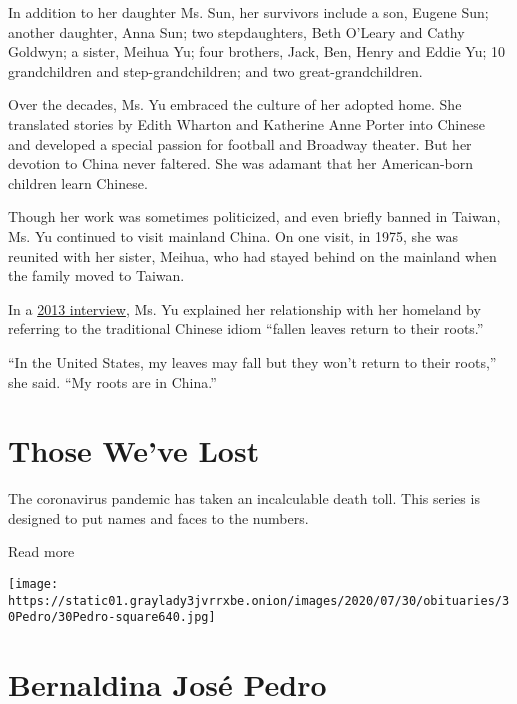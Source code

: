 In addition to her daughter Ms. Sun, her survivors include a son, Eugene
Sun; another daughter, Anna Sun; two stepdaughters, Beth O'Leary and
Cathy Goldwyn; a sister, Meihua Yu; four brothers, Jack, Ben, Henry and
Eddie Yu; 10 grandchildren and step-grandchildren; and two
great-grandchildren.

Over the decades, Ms. Yu embraced the culture of her adopted home. She
translated stories by Edith Wharton and Katherine Anne Porter into
Chinese and developed a special passion for football and Broadway
theater. But her devotion to China never faltered. She was adamant that
her American-born children learn Chinese.

Though her work was sometimes politicized, and even briefly banned in
Taiwan, Ms. Yu continued to visit mainland China. On one visit, in 1975,
she was reunited with her sister, Meihua, who had stayed behind on the
mainland when the family moved to Taiwan.

In a
\href{https://xw.qq.com/partner/standard/20200503A0LZLN/20200503A0LZLN00?ADTAG=standard\&pgv_ref=standard}{2013
interview}, Ms. Yu explained her relationship with her homeland by
referring to the traditional Chinese idiom ``fallen leaves return to
their roots.''

``In the United States, my leaves may fall but they won't return to
their roots,'' she said. ``My roots are in China.''

\href{https://www.nytimes3xbfgragh.onion/interactive/2020/obituaries/people-died-coronavirus-obituaries.html?action=click\&pgtype=Article\&state=default\&region=BELOW_MAIN_CONTENT\&context=covid_obits_promo}{}

\hypertarget{those-weve-lost}{%
\section{Those We've Lost}\label{those-weve-lost}}

The coronavirus pandemic has taken an incalculable death toll. This
series is designed to put names and faces to the numbers.

Read more

\texttt{[image: https://static01.graylady3jvrrxbe.onion/images/2020/07/30/obituaries/30Pedro/30Pedro-square640.jpg]}

\hypertarget{bernaldina-josuxe9-pedro}{%
\section{Bernaldina José Pedro}\label{bernaldina-josuxe9-pedro}}

